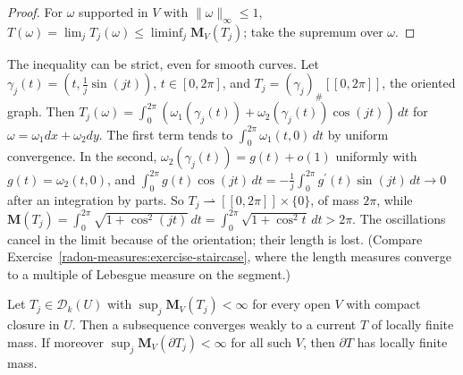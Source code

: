 \begin{proof}
For $\omega$ supported in $V$ with $\|\omega\|_\infty \leq 1$, $T(\omega) = \lim_jT_j(\omega) \leq \liminf_j\mathbf{M}_V(T_j)$; take the supremum over $\omega$.
\end{proof}

\begin{example}\label{currents:example-mass-drop}
The inequality can be strict, even for smooth curves. Let $\gamma_j(t) = (t, \frac1j\sin(jt))$, $t \in [0, 2\pi]$, and $T_j = (\gamma_j)_\#[\![0, 2\pi]\!]$, the oriented graph. Then
$T_j(\omega) = \int_0^{2\pi}(\omega_1(\gamma_j(t)) + \omega_2(\gamma_j(t))\cos(jt))\,dt$ for $\omega = \omega_1dx + \omega_2dy$. The first term tends to $\int_0^{2\pi}\omega_1(t, 0)\,dt$ by uniform convergence. In the second,
$\omega_2(\gamma_j(t)) = g(t) + o(1)$ uniformly with $g(t) = \omega_2(t, 0)$, and $\int_0^{2\pi}g(t)\cos(jt)\,dt = -\frac1j\int_0^{2\pi}g^{\prime}(t)\sin(jt)\,dt \to 0$ after an integration by parts. So
$T_j \rightharpoonup [\![0, 2\pi]\!] \times \{0\}$, of mass $2\pi$, while $\mathbf{M}(T_j) = \int_0^{2\pi}\sqrt{1 + \cos^2(jt)}\,dt = \int_0^{2\pi}\sqrt{1 + \cos^2t}\,dt > 2\pi$. The oscillations cancel in the limit because of
the orientation; their length is lost. (Compare Exercise~\ref{radon-measures:exercise-staircase}, where the length measures converge to a multiple of Lebesgue measure on the segment.)
\end{example}

\begin{theorem}\label{currents:theorem-compactness-mass}
Let $T_j \in \mathcal{D}_k(U)$ with $\sup_j\mathbf{M}_V(T_j) < \infty$ for every open $V$ with compact closure in $U$. Then a subsequence converges weakly to a current $T$ of locally finite mass. If moreover
$\sup_j\mathbf{M}_V(\partial T_j) < \infty$ for all such $V$, then $\partial T$ has locally finite mass.
\end{theorem}

